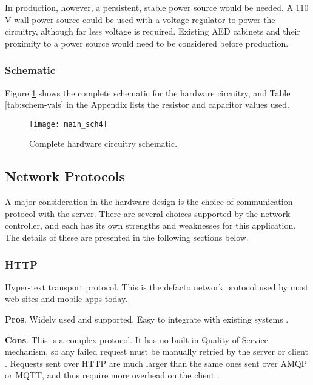 In production, however, a persistent, stable power source would be needed. A 110 V wall power source could be used with a voltage regulator to power the circuitry, although far less voltage is required. Existing AED cabinets and their proximity to a power source would need to be considered before production. 

\subsubsection{Schematic}

Figure \ref{fig:mainschem} shows the complete schematic for the hardware circuitry, and Table \ref{tab:schem-vals} in the Appendix lists the resistor and capacitor values used.

\begin{figure}[h]
\begin{center}
\texttt{[image: main\_sch4]}
\caption{Complete hardware circuitry schematic.}
\label{fig:mainschem}
\end{center}
\end{figure}

\subsection{Network Protocols} \label{sec:hard-protos}

A major consideration in the hardware design is the choice of communication protocol with the server. There are several choices supported by the network controller, and each has its own strengths and weaknesses for this application. The details of these are presented in the following sections below.

\subsubsection{HTTP}

Hyper-text transport protocol. This is the defacto network protocol used by most web sites and mobile apps today.

\noindent\textbf{Pros}. Widely used and supported. Easy to integrate with existing systems \cite{ironio-iot}. 

\noindent\textbf{Cons}. This is a complex protocol. It has no built-in Quality of Service mechanism, so any failed request must be manually retried by the server or client \cite{redbooks-mqtt}. Requests sent over HTTP are much larger than the same ones sent over AMQP or MQTT, and thus require more overhead on the client \cite{redbooks-mqtt}.

